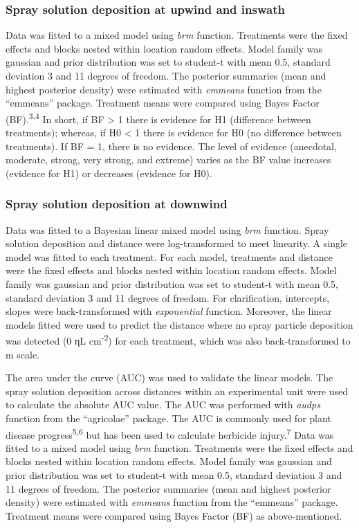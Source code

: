 \documentclass[
  12pt,
  a4paper,
]{article}
\begin{document}
\hypertarget{spray-solution-deposition-at-upwind-and-inswath}{%
\subsubsection{Spray solution deposition at upwind and
inswath}\label{spray-solution-deposition-at-upwind-and-inswath}}

Data was fitted to a mixed model using \emph{brm} function. Treatments
were the fixed effects and blocks nested within location random effects.
Model family was gaussian and prior distribution was set to student-t
with mean 0.5, standard deviation 3 and 11 degrees of freedom. The
posterior summaries (mean and highest posterior density) were estimated
with \emph{emmeans} function from the ``emmeans'' package. Treatment
means were compared using Bayes Factor (BF).\textsuperscript{3,4} In
short, if BF \textgreater{} 1 there is evidence for H1 (difference
between treatments); whereas, if H0 \textless{} 1 there is evidence for
H0 (no difference between treatments). If BF = 1, there is no evidence.
The level of evidence (anecdotal, moderate, strong, very strong, and
extreme) varies as the BF value increases (evidence for H1) or decreases
(evidence for H0).

\hypertarget{spray-solution-deposition-at-downwind}{%
\subsubsection{Spray solution deposition at
downwind}\label{spray-solution-deposition-at-downwind}}

Data was fitted to a Bayesian linear mixed model using \emph{brm}
function. Spray solution deposition and distance were log-transformed to
meet linearity. A single model was fitted to each treatment. For each
model, treatments and distance were the fixed effects and blocks nested
within location random effects. Model family was gaussian and prior
distribution was set to student-t with mean 0.5, standard deviation 3
and 11 degrees of freedom. For clarification, intercepts, slopes were
back-transformed with \emph{exponential} function. Moreover, the linear
models fitted were used to predict the distance where no spray particle
deposition was detected (0 ηL cm\textsuperscript{-2}) for each
treatment, which was also back-transformed to m scale.

The area under the curve (AUC) was used to validate the linear models.
The spray solution deposition across distances within an experimental
unit were used to calculate the absolute AUC value. The AUC was
performed with \emph{audps} function from the ``agricolae'' package. The
AUC is commonly used for plant disease progress\textsuperscript{5,6} but
has been used to calculate herbicide injury.\textsuperscript{7} Data was
fitted to a mixed model using \emph{brm} function. Treatments were the
fixed effects and blocks nested within location random effects. Model
family was gaussian and prior distribution was set to student-t with
mean 0.5, standard deviation 3 and 11 degrees of freedom. The posterior
summaries (mean and highest posterior density) were estimated with
\emph{emmeans} function from the ``emmeans'' package. Treatment means
were compared using Bayes Factor (BF) as above-mentioned.
\end{document}
